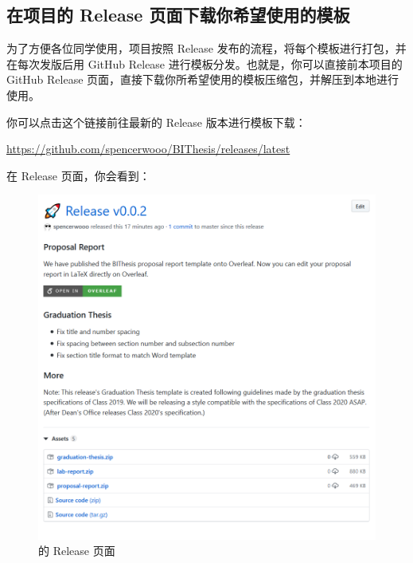 \subsection{在项目的 Release 页面下载你希望使用的模板}
为了方便各位同学使用，项目按照 Release 发布的流程，将每个模板进行打包，并在每次发版后用 GitHub Release 进行模板分发。也就是，你可以直接前本项目的 GitHub Release 页面，直接下载你所希望使用的模板压缩包，并解压到本地进行使用。

你可以点击这个链接前往最新的 Release 版本进行模板下载：

\begin{center}
  \color{ForestGreen}\href{https://github.com/spencerwooo/BIThesis/releases/latest}{https://github.com/spencerwooo/BIThesis/releases/latest}
\end{center}

在 Release 页面，你会看到：


\begin{figure}[H]
  \centering
  \includegraphics[width=\textwidth]{images/release.png}
  \caption{{\BIThesis} 的 Release 页面}
\end{figure}

